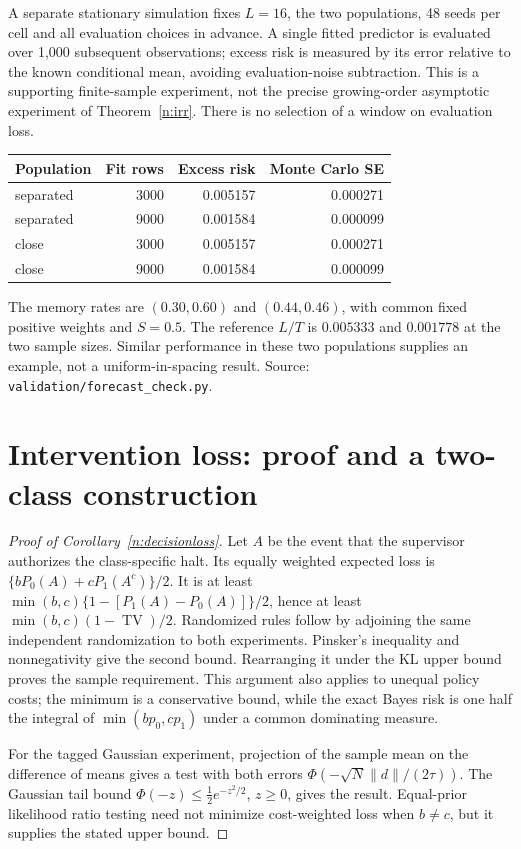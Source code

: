 \documentclass[12pt]{article}
\theoremstyle{definition}
\theoremstyle{remark}
\begin{document}
A separate stationary simulation fixes $L=16$, the two populations, 48 seeds per cell and all evaluation choices in advance. A single fitted predictor is evaluated over 1,000 subsequent observations; excess risk is measured by its error relative to the known conditional mean, avoiding evaluation-noise subtraction. This is a supporting finite-sample experiment, not the precise growing-order asymptotic experiment of Theorem~\ref{n:irr}. There is no selection of a window on evaluation loss.
\begin{center}\begin{tabular}{lrrr}\toprule Population & Fit rows & Excess risk & Monte Carlo SE\\\midrule
separated & 3000 & 0.005157 & 0.000271\\
separated & 9000 & 0.001584 & 0.000099\\
close & 3000 & 0.005157 & 0.000271\\
close & 9000 & 0.001584 & 0.000099\\
\bottomrule\end{tabular}\end{center}
The memory rates are $(0.30,0.60)$ and $(0.44,0.46)$, with common fixed positive weights and $S=0.5$. The reference $L/T$ is $0.005333$ and $0.001778$ at the two sample sizes. Similar performance in these two populations supplies an example, not a uniform-in-spacing result. Source: \nolinkurl{validation/forecast_check.py}.


\section{Intervention loss: proof and a two-class construction}\label{app:revisiondecision}

\begin{proof}[Proof of Corollary~\ref{n:decisionloss}]
Let $A$ be the event that the supervisor authorizes the class-specific halt. Its equally weighted expected loss is $\{bP_0(A)+cP_1(A^c)\}/2$. It is at least
$\min(b,c)\{1-[P_1(A)-P_0(A)]\}/2$, hence at least $\min(b,c)(1-\operatorname{TV})/2$. Randomized rules follow by adjoining the same independent randomization to both experiments. Pinsker's inequality and nonnegativity give the second bound. Rearranging it under the KL upper bound proves the sample requirement. This argument also applies to unequal policy costs; the minimum is a conservative bound, while the exact Bayes risk is one half the integral of $\min(bp_0,cp_1)$ under a common dominating measure.

For the tagged Gaussian experiment, projection of the sample mean on the difference of means gives a test with both errors $\Phi(-\sqrt N\|d\|/(2\tau))$. The Gaussian tail bound $\Phi(-z)\le\tfrac12 e^{-z^2/2}$, $z\ge0$, gives the result. Equal-prior likelihood ratio testing need not minimize cost-weighted loss when $b\ne c$, but it supplies the stated upper bound.
\end{proof}
\end{document}
